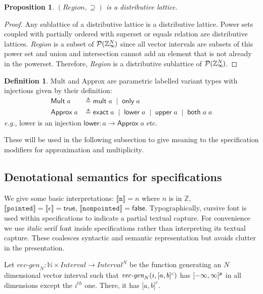 \documentclass{article}
\theoremstyle{definition}
\newtheorem{defn}{Definition}
\theoremstyle{plain}
\newtheorem{prop}{Proposition}
\theoremstyle{remark}
\newcommand{\eg}{\emph{e.g.}}
\newcommand{\zinf}{\textnormal{$\mathbb{Z}_\infty$}}
\newcommand{\interp}[1]{\llbracket{} {#1} \rrbracket{}}
\newcommand{\interv}[3]{\textnormal{$\lbrack#1,#2\rbrack^{#3}$}}
\newcommand{\vecgen}[3]{\textnormal{$\textit{vec-gen}_{#1}(#2,#3)$}}
\begin{document}
\begin{prop}{}
  $(\textit{Region},\supseteq)$ is a distributive lattice.
\end{prop}
%
\begin{proof}
  Any sublattice of a distributive lattice is a distributive lattice. Power sets
  coupled with partially ordered with superset or equals relation are
  distributive lattices. \textit{Region} is a subset of
  $\mathcal{P}{(\zinf{}^{\mkern-19mu{N}})}$ since all vector intervals are
  subsets of this power set and union and intersection cannot add an element
  that is not already in the powerset. Therefore, \textit{Region} is a
  distributive sublattice of $\mathcal{P}{(\zinf{}^{\mkern-19mu{N}})}$.
\end{proof}

\begin{defn}{}
  \textsf{Mult} and \textsf{Approx} are parametric labelled variant types with
  injections given by their definition:
%
  \begin{align*}
    \textsf{Mult} \; a &
      \triangleq \textsf{mult} \; a \;\mid\; \textsf{only} \; a \\
    \textsf{Approx} \; a &
      \triangleq \textsf{exact} \; a \;\mid\; \textsf{lower} \; a \;\mid\;
        \textsf{upper} \; a \;\mid\; \textsf{both} \; a \; a
  \end{align*}
%
  \eg{}, \textsf{lower} is an injection $\mathsf{lower} : a \to \mathsf{Approx}
  \; a$ etc.

  These will be used in the following subsection to give meaning to the
  specification modifiers for approximation and multiplicity.
\end{defn}

\subsection{Denotational semantics for specifications}

We give some basic interpretations: $\interp{\texttt{n}} = n$ where $n$ is in
$\mathbb{Z}$, $\interp{\texttt{pointed}} = \llbracket \epsilon \rrbracket =
\textsf{true}$, $\interp{\texttt{nonpointed}} = \textsf{false}$.
Typographically, cursive font is used within specifications to indicate a
partial textual capture. For convenience we use \textit{italic} serif font
inside specifications rather than interpreting its textual capture.  These
coalesces syntactic and semantic representation but avoids clutter in the
presentation.

Let $\textit{vec-gen}_N : \mathbb{N} \times \textit{Interval} \to
\textit{Interval}^N$ be the function generating an $N$ dimensional vector
interval such that \vecgen{N}{i}{\interv{a}{b}{c}} has
$\interv{-\infty}{\infty}{\textsf{p}}$ in all dimensions except the $i^{th}$
one. There, it has \interv{a}{b}{c}.
\end{document}
